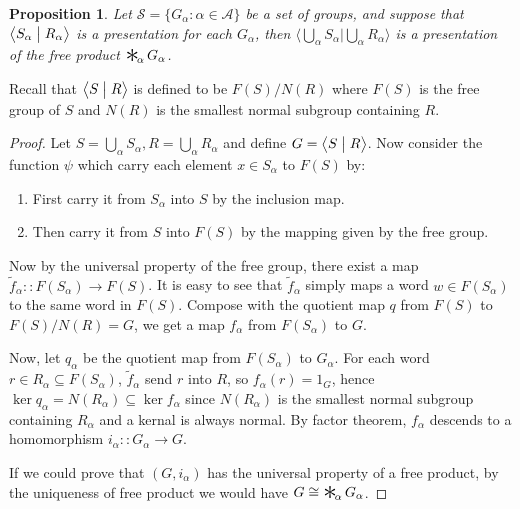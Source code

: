 \documentclass[a4paper]{article}
\theoremstyle{remark}
\theoremstyle{definition}
\theoremstyle{definition}
\theoremstyle{plain}
\newtheorem{proposition}{Proposition}
\DeclareMathOperator*{\freeprod}{\raisebox{-0.4ex}{\scalebox{2}{$\ast$}}\!}
\begin{document}
  \begin{proposition}
    Let $\mathcal{S} = \{ G_\alpha : \alpha \in \mathcal{A} \}$ be a set of groups, and suppose that
    $\big\langle S_\alpha \bigm| R_\alpha \big\rangle$ is a presentation for each $G_\alpha$, then 
    $\Big\langle \bigcup\limits_\alpha S_\alpha \mathrel{\Big|} \bigcup\limits_\alpha R_\alpha \Big\rangle$
    is a presentation of the free product $\freeprod_\alpha G_\alpha$.
  \end{proposition}

  Recall that $\big\langle S \bigm| R \big\rangle$ is defined to be $F(S) / N(R)$ where $F(S)$ is
  the free group of $S$ and $N(R)$ is the smallest normal subgroup containing $R$.

  \begin{proof}
    Let $S = \bigcup_\alpha S_\alpha, R = \bigcup_\alpha R_\alpha$ and define 
    $G = \big\langle S \bigm| R \big\rangle$. Now consider the function $\psi$ which
    carry each element $x \in S_\alpha$ to $F(S)$ by:
    \begin{enumerate}
      \item First carry it from $S_\alpha$ into $S$ by the inclusion map.
      \item Then carry it from $S$ into $F(S)$ by the mapping given by the free group.
    \end{enumerate}
    Now by the universal property of the free group, there exist a map 
    $\tilde{f}_\alpha :: F(S_\alpha) \to F(S)$. It is easy to see that $\tilde{f}_\alpha$
    simply maps a word $w \in F(S_\alpha)$ to the same word in $F(S)$.
    Compose with the quotient map $q$ from $F(S)$ to $F(S) / N(R) = G$, we get a map $f_\alpha$ from
    $F(S_\alpha)$ to $G$. 

    Now, let $q_\alpha$ be the quotient map from $F(S_\alpha)$ to $G_\alpha$.
    For each word $r \in R_\alpha \subseteq F(S_\alpha)$, $\tilde{f}_\alpha$ send $r$ into $R$,
    so $f_\alpha(r) = 1_G$, hence $\ker q_\alpha = N(R_\alpha) \subseteq \ker f_{\alpha}$ since $N(R_\alpha)$ is the smallest
    normal subgroup containing $R_\alpha$ and a kernal is always normal. By factor theorem, $f_\alpha$
    descends to a homomorphism $i_\alpha :: G_\alpha \to G$.

    If we could prove that $(G, i_\alpha)$ has the universal property of a free product, by the uniqueness
    of free product we would have $G \cong \freeprod_\alpha G_\alpha$.


\end{proof}
\end{document}
